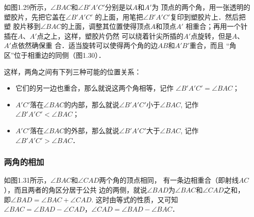 如图1.29所示，$\angle BAC$和$\angle B'A'C'$分别是以$A$和$A'$为
顶点的两个角，用一张透明的塑胶片，先把它盖在$\angle B'A'C'$
的上面，用笔把$\angle B'A'C'$复印到塑胶片上．然后把塑
胶片移到$\angle BAC$的上面，调整其位置使得顶点$A$和顶点$A'$
相重合；再用一个针插在$A$、$A'$点之上，这样，塑胶片仍然
可以绕着针尖所插的$A'$点旋转，但是$A$、$A'$点依然确保重
合．适当旋转可以使得两个角的边$AB$和$A'B'$重合，而且
“角区”位于相重边的同侧（图1.30）．
\begin{figure}[htp]\centering
    \begin{minipage}[t]{0.48\textwidth}
    \centering
{}
    \caption{}
    \end{minipage}
    \begin{minipage}[t]{0.48\textwidth}
    \centering
    \caption{}
    \end{minipage}
    \end{figure}


这样，两角之间有下列三种可能的位置关系：
\begin{itemize}
	\item 它们的另一边也重合，那么就说这两个角相等，记作
	$\angle B'A'C'=\angle BAC$；
	\item $A'C'$落在$\angle BAC$的内部，那么就说$\angle B'A'C'$小于$\angle BAC$, 记作$\angle B'A'C'<\angle BAC$；
	\item $A'C'$落在$\angle BAC$的外部，那么就说$\angle B'A'C'$大于$\angle BAC$, 记作$\angle B'A'C'>\angle BAC$．
\end{itemize}

\subsubsection{两角的相加}
如图1.31所示，$\angle BAC$和$\angle CAD$两个角的顶点相同，
有一条边相重合（即射线$AC$），而且两者的角区分居于公共
边的两侧，就说$\angle BAD$为$\angle BAC$和$\angle CAD$之和，即$\angle BAD=\angle BAC+\angle CAD$. 这时由等式的性质，又可知$\angle BAC=\angle BAD-\angle CAD$，$\angle CAD=\angle BAD-\angle BAC$．


